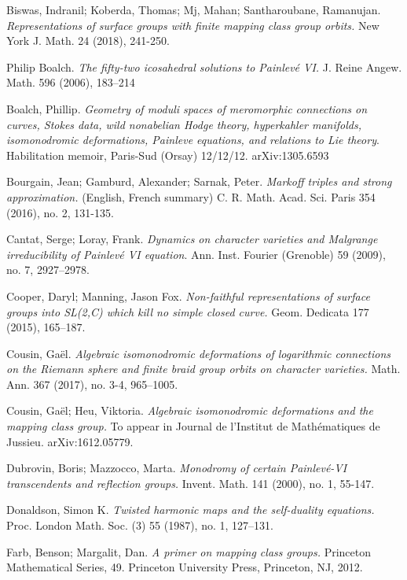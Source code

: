 \documentclass[reqno]{amsart}
\theoremstyle{plain}
\theoremstyle{definition}
\theoremstyle{remark}
\begin{document}
\begin{thebibliography}{99}

Biswas, Indranil; Koberda, Thomas; Mj, Mahan; Santharoubane, Ramanujan.
\emph{Representations of surface groups with finite mapping class group orbits.}
 New York J. Math. 24 (2018), 241-250.

Philip Boalch. \emph{The fifty-two icosahedral solutions to Painlev\'e VI.}
J. Reine Angew. Math. 596 (2006), 183--214

Boalch, Phillip.
\emph{Geometry of moduli spaces of meromorphic connections on curves, Stokes data, wild nonabelian Hodge theory, hyperkahler manifolds, isomonodromic deformations, Painleve equations, and relations to Lie theory}.
Habilitation memoir, Paris-Sud (Orsay) 12/12/12. arXiv:1305.6593

Bourgain, Jean; Gamburd, Alexander; Sarnak, Peter.
\emph{Markoff triples and strong approximation.} (English, French summary) 
C. R. Math. Acad. Sci. Paris 354 (2016), no. 2, 131-135.

Cantat, Serge; Loray, Frank.
\emph{Dynamics on character varieties and Malgrange irreducibility of Painlev\'e VI equation}.
Ann. Inst. Fourier (Grenoble) 59 (2009), no. 7, 2927--2978.

Cooper, Daryl; Manning, Jason Fox.
\emph{Non-faithful representations of surface groups into SL(2,C) which kill no simple closed curve.}
Geom. Dedicata 177 (2015), 165--187.

Cousin, Ga\"el.
\emph{Algebraic isomonodromic deformations of logarithmic connections on the Riemann sphere and finite braid group orbits on character varieties.}
Math. Ann. 367 (2017), no. 3-4, 965--1005.

Cousin, Ga\"el; Heu, Viktoria.
\emph{Algebraic isomonodromic deformations and the mapping class group.}
To appear in Journal de l'Institut de Math\'ematiques de Jussieu. arXiv:1612.05779.

Dubrovin, Boris; Mazzocco, Marta.
\emph{Monodromy of certain Painlev\'e-VI transcendents and reflection groups.}
Invent. Math. 141 (2000), no. 1, 55-147.

Donaldson, Simon K.
\emph{Twisted harmonic maps and the self-duality equations.}
Proc. London Math. Soc. (3) 55 (1987), no. 1, 127--131. 

Farb, Benson; Margalit, Dan.
\emph{A primer on mapping class groups.}
Princeton Mathematical Series, 49. Princeton University Press, Princeton, NJ, 2012.


\end{thebibliography}
\end{document}
